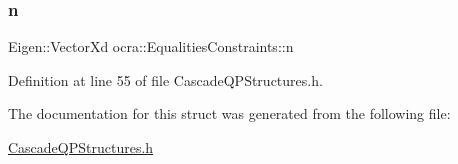 \subsubsection{\texorpdfstring{n}{n}}
{\footnotesize\ttfamily Eigen\+::\+Vector\+Xd ocra\+::\+Equalities\+Constraints\+::n}



Definition at line 55 of file Cascade\+Q\+P\+Structures.\+h.



The documentation for this struct was generated from the following file\+:\begin{DoxyCompactItemize}
\item 
\hyperlink{CascadeQPStructures_8h}{Cascade\+Q\+P\+Structures.\+h}\end{DoxyCompactItemize}
